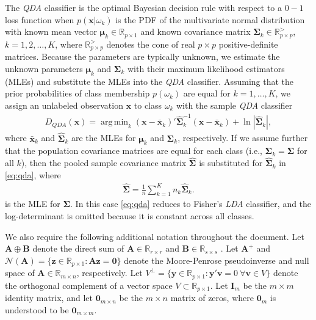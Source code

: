 \documentclass[11pt]{article}
\newcommand{\xbar}{\bar{\bm x}}
\DeclareMathOperator*{\argmin}{arg\,min}
\begin{document}
The \emph{QDA} classifier is the optimal Bayesian decision rule with respect to a $0-1$ loss function when $p(\bm x | \omega_k)$ is the PDF of the multivariate normal distribution with known mean vector  $\bm\mu_k \in \mathbb{R}_{p \times 1}$ and known covariance matrix $\bm\Sigma_k \in \mathbb{R}_{p \times p}^{>}$, $k = 1, 2, \ldots, K$, where $\mathbb{R}_{p \times p}^{>}$ denotes the cone of real $p \times p$ positive-definite matrices. Because the parameters are typically unknown, we estimate the unknown parameters $\bm \mu_k$ and $\bm\Sigma_k$ with their maximum likelihood estimators (MLEs) and substitute the MLEs into the \emph{QDA} classifier. Assuming that the prior probabilities of class membership $p(\omega_k)$ are equal for $k = 1, \ldots, K$, we assign an unlabeled observation $\bm x$ to class $\omega_k$ with the sample \emph{QDA} classifier
\begin{align}
	D_{QDA}(\bm x) = \argmin_{k}  (\bm x - \xbar_k)'\widehat{\bm\Sigma}_k^{-1}(\bm x - \xbar_k)  + \ln |\widehat{\bm\Sigma}_k|, \label{eq:qda}
\end{align}
where $\xbar_k$ and $\widehat{\bm\Sigma}_k$ are the MLEs for $\bm \mu_k$ and $\bm \Sigma_k$, respectively. If we assume further that the population covariance matrices are equal for each class (i.e., $\bm\Sigma_k = \bm\Sigma$ for all $k$), then the pooled sample covariance matrix $\widehat{\bm\Sigma}$ is substituted for $\widehat{\bm \Sigma}_k$ in \eqref{eq:qda}, where
\begin{align}
	\widehat{\bm\Sigma} = \frac{1}{n} \sum_{k=1}^K n_k \widehat{\bm\Sigma}_k. \label{eq:pooled-cov}
\end{align}
is the MLE for $\bm \Sigma$. In this case \eqref{eq:qda} reduces to Fisher's \emph{LDA} classifier, and the log-determinant is omitted because it is constant across all classes.

We also require the following additional notation throughout the document. Let $\bm A \oplus \bm B$ denote the direct sum of $\bm A \in \mathbb{R}_{r \times r}$ and $\bm B \in \mathbb{R}_{s \times s}$ \citep[Chapter 1]{Lutkepohl:1996uz}. Let $\bm A^+$ and $\mathcal{N}(\bm A) = \{\bm z \in \mathbb{R}_{p \times 1} : \bm A \bm z = \bm 0\}$ denote the Moore-Penrose pseudoinverse and null space of $\bm A \in \mathbb{R}_{m \times n}$, respectively. Let $V^{\perp} = \{\bm y \in \mathbb{R}_{p \times 1} : \bm y'\bm v = 0\ \forall \bm v \in V \}$ denote the orthogonal complement of a vector space $V \subset \mathbb{R}_{p \times 1}$. Let $\bm I_m$ be the $m \times m$ identity matrix, and let $\bm 0_{m \times n}$ be the $m \times n$ matrix of zeros, where $\bm 0_m$ is understood to be $\bm 0_{m \times m}$.
\end{document}
